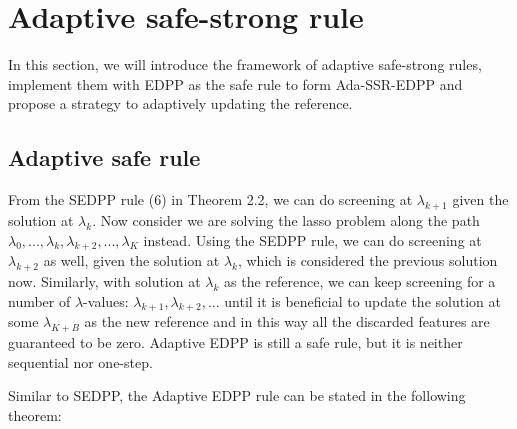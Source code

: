 \documentclass{article}
\begin{document}
\section{Adaptive safe-strong rule}
\label{sec:method}

In this section, we will introduce the framework of adaptive safe-strong rules, implement them with EDPP as the safe rule to form Ada-SSR-EDPP and propose a strategy to adaptively updating the reference.

\subsection{Adaptive safe rule}

From the SEDPP rule (6) in Theorem 2.2, we can do screening at $\lambda_{k+1}$ given the solution at $\lambda_k$. Now consider we are solving the lasso problem along the path $\lambda_0,...,\lambda_k,\lambda_{k+2},...,\lambda_K$ instead. Using the SEDPP rule, we can do screening at $\lambda_{k+2}$ as well, given the solution at $\lambda_k$, which is considered the previous solution now. Similarly, with solution at $\lambda_k$ as the reference, we can keep screening for a number of $\lambda$-values: $\lambda_{k+1},\lambda_{k+2},...$ until it is beneficial to update the solution at some $\lambda_{K+B}$ as the new reference and in this way all the discarded features are guaranteed to be zero. Adaptive EDPP is still a safe rule, but it is neither sequential nor one-step.

Similar to SEDPP, the Adaptive EDPP rule can be stated in the following theorem:
\end{document}
